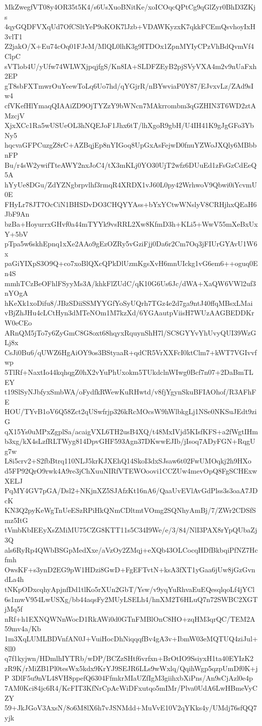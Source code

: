 MkZwegfVT08y4OR35t5K4/s6UsXuoBNitKe/xoICOqcQPtCg9qGlZyr0BhD3ZKjs
4qyGQDFVXqUd7OfCSltYeP9oKOK7lJzb+VDAWKyzxK7qkkFCEmQsvhoyIxH3vlT1
Z2jakO/X+Eu74cOq01FJeM/MlQL0lhK3g9ITDOx1ZpnMYIyCPzVhBdQvmVf4ClpC
sVTlob4U/yUfw74WLWXjpqjfgS/Kn8IA+SLDFZEyB2pjSVyVXA4m2v9nUaFxh2EP
gT8sbFXTmwrOuYeewToLq6Uo7hd/qYGjrR/nBYwviaP0Y87/EJvxvLz/ZAd9sIw4
cfVKefHlYmaqQIAAiZD9OjTYZzY9bWNcn7MAkrrombm3qGZHIN3T6WD2ztAMzcjV
XjxXCc1Ra5wUSUeOL3hNQEJoF1Jhx6tT/lhXgoR9gbH/U4IH41K9gJgGFo3YbNy5
hqcvaGFPCuzgZ8rC+AZBqjEp8nYIGoq8UpGxAsFejwD0fnuYZWoJXQly6MBbbnFP
Bu/r4sW2ywifTteAWY2nxJoC4/tX3mKLj0YO30UjT2wfz6DUuEd1zFsGzCdEeQ5A
hYyUe8DGu/ZdYZNgbrpvlhf3rmqR4XRDX1vJ60L0py42WrhwoV9Qbwi0iYcvmU0E
FHyLr78JT7OcCiN1BHSDvDO3CHQYYAss+bYxYCtwWNslyV8CRHjhxQEaH6JbF9An
bzBa+HoyurrxGHvf0a44mTYYk9vsRRL2Xw8KfmD3h+KLi5+WwV55mXeBxUxY+5bV
pTpa5w6skhEpnq1xXe2AAo9gEzOZRy5vGziFjj0Da6r2Cm7Oq3jFIUrGYAvU1W6x
paGiYIXpS3O9Q+co7xoBlQXcQPkDlUzmKgsXvH6mnUIckg1vG6em6++oguq0En4S
mmhTCzBeOFhlFSyyMs3A/khkFlZUdC/qK10G6Us6Jc/dWA+XaQW6VWl2uf3nYOgA
hKeXk1xoDifu8/JBzSDiiSSMYYGfYoSyUQrh7TGz4e2d7ga9ntJ40ffqMBsxLMai
vBjZhJHu4cLCtHyn3dMTeNOm1M7kzXd/6YGAautpViisH7WUzAAGBEDDKrW0eCEo
ARnQM5jTo7y6ZyGmC8G8oxt68hqyxRquynShH7l/SC8GYYvYhUvyQUI39WzGLj8x
CsJi0Bu6/qUWZ6HgAiOY9os3BStyaaR+qdCR5VrXXFcI0ktClm7+kWT7VGIvvfwp
5TlRf+NaxtIo44kqhqgZ0hX2vYuPhUxokm5TUkdclnWIwg0Bcf7n07+2DaBmTLEY
t19SlSyNJbfyxSmbWA/oFydfkRWewKuRHwtd/v8fjYgynSkuBFIAOhof/R3AFhFE
HOU/TYvB1oV6Q58Zct2qUSwfrjp326kRcMOcsW9hWlbkgLj1NSe0NKSuJEdt9ziG
qX15Ys0uMPxZgplSa/acaigVXL6TH2usB4XQ/t48MxIVjd5KIsfKFS+a2fWgtIHm
b3xg/kX4sLzfRLTWyg814DpvGHF593Agn37DKwwEJIb/jIsoq7ADyFGN+RqgUg7w
L8i5crv2+S2fbBtrq110NLJ5krKJXEhQ14SkoI3dxSJsaw6t02FwUMOqkj2h9HXo
d5FP92QrO9rwk4A9re3jChXuuNIRfVTEWOoovi1CCZUw4mevOpQ8FgSCHExwXELJ
PqMY4GV7pGA/Dsl2+NKjnXZ5SJAfzKt16nA6/QaaUvEVlAvGdPlss3s3oaA7JDcK
KN3Q2pyKeWgTnUeESzRPiHkQNmCDltmtVOmg2SQNhyAmBj/7/ZWr2CDSfSmz5ItG
tVmbKbIEEyXsZMiMU75CZG8KTT11s5C34I9We/e/3/84/NlI3PAX8rYpQUbaZj3Q
als6RyRp4QWbBSGpMedXxe/aVzOy2ZMqj+eXQb43OLCocqHDfBkbqiPfNZ7Hcfmh
OwsKF+s3ynD2EG9pW1HDzi8GwD+FgEFTvtN+ksA3fXT1yGaa6jUw8jGzGvndLa4h
tNKpODxcqhyApjnfDd1tlKo5rXUn2GbT/Ysw/v9yqYuRhvaEuEQesqlqoLf4jYCl
6s1mwV954LwUSXg/bb44aqsFy2MUyLSELh4/hnXM2T6HLuQ7n72SWBC2XGTjMq5f
nRf+h1EXNQWNnWocD1RkAWi0d0GTnFMBlOnC8HO+zqHM3qrQC/TEM2A59mv4a/Kb
1m3XqLUMLBDVnfAN0J+VuiHocDhNiqqqfBv4gA3v+IbmW03eMQTUQ4ziJul+8ll0
q7f1kyjwn/HDmlhIYTRb/wDP/BCZzSHtf6vrfxn+BrOtIO9SsiyxH1ta40EYIzK2
zR9K/rMiZB1Pl0tesWx5kdx9KrYJ9SEJR6LLs9wWxlq/QqihWgp5qzpUmDf0K+jP
3DlF5u9nVL48VH8ppefQ6304FfmkrMIaUZfIgM3giihxbXiPns/An9sCjAzl0e4p
7AM0Kci84jc6R4/KcFIT3KfNrCpAcWiDFxutqo5mIMr/Plva0UdA6LwHBmeVyCZY
59+JkJGoV3AxsN/8o6M8lX6h7vJSNMdd+MuVvE10V2qYKks4y/UMdj76sfQQ7yjk
